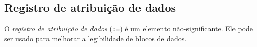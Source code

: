 \documentclass[11pt, brazil]{report}
\begin{document}
%
%
%
%
%


\subsection{Registro de atribuição de dados}

O {\it registro de atribuição de dados} ({\tt:=}) é um elemento não-significante.
Ele pode ser usado para melhorar a legibilidade de blocos de dados.

\end{document}
